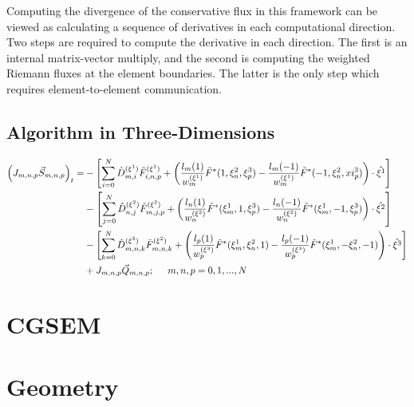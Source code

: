 \documentclass[12pt]{softwaremanual}
\begin{document}
 Computing the divergence of the conservative flux in this framework can be viewed as calculating a sequence of derivatives in each computational direction. Two steps are required to compute the derivative in each direction. The first is an internal matrix-vector multiply, and the second is computing the weighted Riemann fluxes at the element boundaries. The latter is the only step which requires element-to-element communication.
 
 \subsection{Algorithm in Three-Dimensions}
 \begin{equation}
 \begin{split}
 \left( J_{m,n,p} \vec{S}_{m,n,p} \right)_t =  &-\left[\sum_{i=0}^{N}\hat{D}^{(\xi^1)}_{m,i} \tilde{F}^{(\xi^1)}_{i,n,p}   + \left( \frac{ l_m(1)}{w^{(\xi^1)}_m} \tilde{F}^{*}(1,\xi^2_n,\xi^3_p) - \frac{ l_m(-1)}{w^{(\xi^1)}_m} \tilde{F}^{*}(-1,\xi^2_n,xi^3_p) \right) \cdot \hat{\xi^1} \right] \\
 &-\left[ \sum_{j=0}^{N}\hat{D}^{(\xi^2)}_{n,j} \tilde{F}^{(\xi^2)}_{m,j,p}  + \left( \frac{l_n(1)}{w^{(\xi^2)}_n} \tilde{F}^{*}(\xi^1_m,1,\xi^3_p)  -  \frac{l_n(-1)}{w^{(\xi^2)}_n} \tilde{F}^{*}(\xi^1_m,-1,\xi^3_p) \right)\cdot \hat{\xi^2}  \right] \\
 &-\left[ \sum_{k=0}^{N}\hat{D}^{(\xi^3)}_{m,n,k} \tilde{F}^{(\xi^2)}_{m,n,k}  + \left( \frac{l_p(1)}{w^{(\xi^3)}_p} \tilde{F}^{*}(\xi^1_m,\xi^2_n,1)  -  \frac{l_p(-1)}{w^{(\xi^3)}_p} \tilde{F}^{*}(\xi^1_m,-\xi^2_n,-1) \right)\cdot \hat{\xi^3}  \right] \\ 
 &+ J_{m,n,p}\vec{Q}_{m,n,p}; \hspace{5mm} m,n,p=0,1,...,N
\end{split} \label{eq:discrete3d_system} 
 \end{equation}
 
\section{CGSEM}
\section{Geometry}\label{sec:GeometryTheory}
\end{document}
